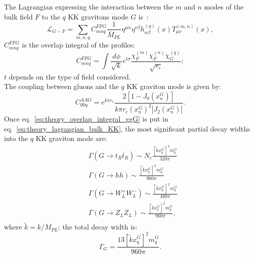The Lagrangian expressing the interaction between the $m$ and $n$ modes of the bulk field $F$ to the $q$ KK gravitons mode $G$ is~\cite{Davoudiasl:2000wi}:
\begin{equation}
\mathcal{L}_{G-F} = \sum_{m,n,q} C_{mnq}^{FFG} \frac{1}{\overline{M}_{PL}} \eta^{\mu \alpha} \eta^{\nu \beta} h_{\alpha \beta}^{(q)} (x) T_{\mu \nu}^{(m,n)}(x),
\label{eq:theory_lagrangian_bulk_KK}
\end{equation}
$C_{mnq}^{FFG}$ is the overlap integral of the profiles:
\begin{equation}
C_{mnq}^{FFG} = \int \frac{d \phi}{\sqrt{k}} e^{t \sigma} \frac{\chi_F^{(m)} \chi_F^{(n)} \chi_G^{(q)}}{\sqrt{r_c}};
\label{eq:theory_overlap_integral}
\end{equation}
$t$ depends on the type of field considered.\\
The coupling between gluons and the $q$ KK graviton mode is given by:
\begin{equation}
C_{00q}^{AAG} = e^{k \pi r_c} \frac{2 \left[ 1 - J_0 (x_n^G)\right]}{k \pi r_c (x_n^G)^2 \left| J_2 (x_n^G)\right|}.
\label{eq:theory_overlap_integral_ggG}
\end{equation}
Once eq.~\ref{eq:theory_overlap_integral_ggG} is put in eq.~\ref{eq:theory_lagrangian_bulk_KK}, the most significant partial decay widths into the $q$ KK graviton mode are:
\begin{equation}
\begin{split}
 & \Gamma \left(G \rightarrow t_R \bar{t}_R \right) \sim N_c \frac{ \left[ \tilde{k} x_q^G \right]^2 m_q^G}{320 \pi} \\
 & \Gamma \left(G \rightarrow h h \right) \sim \frac{\left[ \tilde{k} x_q^G \right]^2 m_q^G}{960 \pi} \\
 & \Gamma \left(G \rightarrow W^+_L W^-_L \right) \sim \frac{\left[ \tilde{k} x_q^G \right]^2 m_q^G}{480 \pi} \\
 & \Gamma \left(G \rightarrow Z_L Z_L \right) \sim \frac{\left[ \tilde{k} x_q^G \right]^2 m_q^G}{960 \pi}, \\
\end{split}
\label{eq:theory_bulk_KK_partial_decay_widths}
\end{equation}
where $\tilde{k} = k/\overline{M}_{PL}$; the total decay width is:
\begin{equation}
\Gamma_G = \frac{13 \left[ \tilde{k} x_q^G \right]^2 m_q^G}{960 \pi}.
\label{eq:theory_bulk_KK_total_decay_width}
\end{equation}

